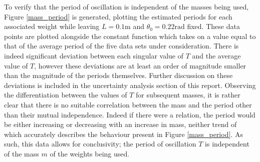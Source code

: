 To verify that the period of oscillation is independent of the masses being used, 
Figure \ref{mass_period} is generated, plotting the estimated periods for each associated 
weight while leaving $L = 0.1\text{m}$ and $\theta_0 = 0.22\text{rad}$ fixed. These data 
points are plotted alongside the constant function which takes on a value equal to that of 
the average period of the five data sets under consideration. There is indeed significant 
deviation between each singular value of $T$ and the average value of $T$, however these 
deviations are at least an order of magnitude smaller than the magnitude of the periods 
themselves. Further discussion on these deviations is included in the uncertainty analysis 
section of this report. Observing the differentiation between the values of $T$ for subsequent 
masses, it is rather clear that there is no suitable correlation between the mass and the 
period other than their mutual independence. Indeed if there were a relation, the period 
would be either increasing or decreasing with an increase in mass, neither trend of which 
accurately describes the behaviour present in Figure \ref{mass_period}. As such, this data 
allows for conclusivity; the period of oscillation $T$ is independent of the mass $m$ of the 
weights being used. \\[0.20cm]


